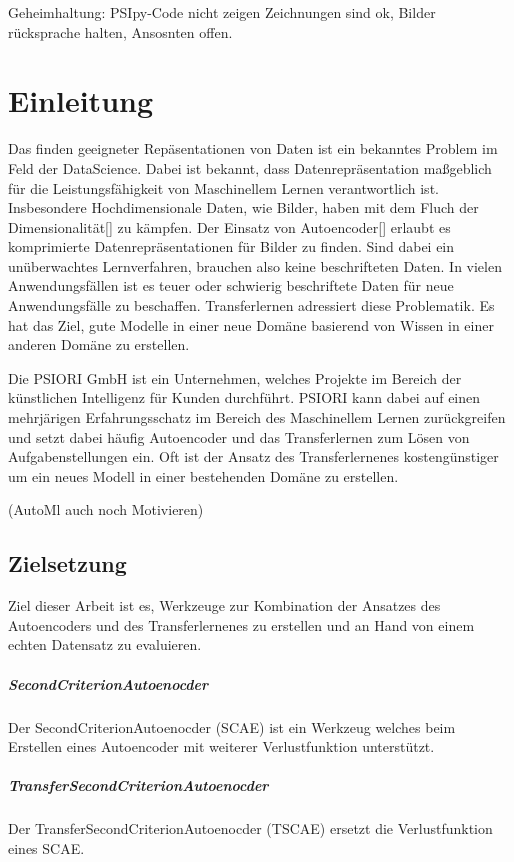 \listoftodos

Geheimhaltung: PSIpy-Code nicht zeigen Zeichnungen sind ok, Bilder rücksprache halten, Ansosnten offen.
  
\chapter{Einleitung}
\label{chap:Einleitung}
	Das finden geeigneter Repäsentationen von Daten ist ein bekanntes Problem im Feld der DataScience. Dabei ist bekannt, dass Datenrepräsentation maßgeblich für die Leistungsfähigkeit von Maschinellem Lernen verantwortlich ist. Insbesondere Hochdimensionale Daten, wie Bilder, haben mit dem Fluch der Dimensionalität[] zu kämpfen. Der Einsatz von Autoencoder[] erlaubt es komprimierte Datenrepräsentationen für Bilder zu finden. Sind dabei ein unüberwachtes Lernverfahren, brauchen also keine beschrifteten Daten.
	In vielen Anwendungsfällen ist es teuer oder schwierig beschriftete Daten für neue Anwendungsfälle zu beschaffen. Transferlernen adressiert diese Problematik. Es hat das Ziel, gute Modelle in einer neue Domäne basierend von Wissen in einer anderen Domäne zu erstellen.
	
	Die PSIORI GmbH \cite{PSIORIGmbH.2020} ist ein Unternehmen, welches Projekte im Bereich der künstlichen Intelligenz für Kunden durchführt. PSIORI kann dabei auf einen mehrjärigen Erfahrungsschatz im Bereich des Maschinellem Lernen zurückgreifen und setzt dabei häufig Autoencoder und das Transferlernen zum Lösen von Aufgabenstellungen ein. Oft ist der Ansatz des Transferlernenes kostengünstiger um ein neues Modell in einer bestehenden Domäne zu erstellen. 

 	(AutoMl auch noch Motivieren)

	\section{Zielsetzung}
	\label{sec:Zielsetzung}
	Ziel dieser Arbeit ist es, Werkzeuge zur Kombination der Ansatzes des Autoencoders und des Transferlernenes zu erstellen und an Hand von einem echten Datensatz zu evaluieren.
	\paragraph{SecondCriterionAutoenocder} Der SecondCriterionAutoenocder (SCAE) ist ein Werkzeug welches beim Erstellen eines Autoencoder mit weiterer Verlustfunktion unterstützt.  
    \paragraph{TransferSecondCriterionAutoenocder} Der TransferSecondCriterionAutoenocder (TSCAE) ersetzt die Verlustfunktion eines SCAE.
